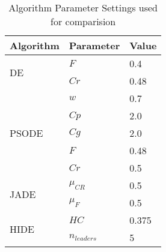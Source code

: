 

\begin{table}[b]
\centering
\caption{Algorithm Parameter Settings used for comparision}
\label{}
\begin{tabular}{|l|l|l|}
\hline
Algorithm & Parameter & Value \\
\hline
\multirow{2}{*}{DE} & $F$ & 0.4 \\ \cline{2-3} 
                  & $Cr$ & 0.48 \\ \hline
\multirow{5}{*}{PSODE} & $w$ & 0.7 \\ \cline{2-3} 
                  & $Cp$ & 2.0 \\ \cline{2-3} 
                  & $Cg$ & 2.0 \\ \cline{2-3} 
                  & $F$ & 0.48 \\ \cline{2-3} 
                  & $Cr$ & 0.5 \\ \hline
\multirow{2}{*}{JADE} & $\mu_{CR}$ & 0.5 \\ \cline{2-3} 
                  & $\mu_{F}$ & 0.5 \\ \hline
\multirow{2}{*}{HIDE} & $HC$ & 0.375 \\ \cline{2-3} 
                  & $n_{leaders}$ & 5 \\ \hline
\end{tabular}
\end{table}